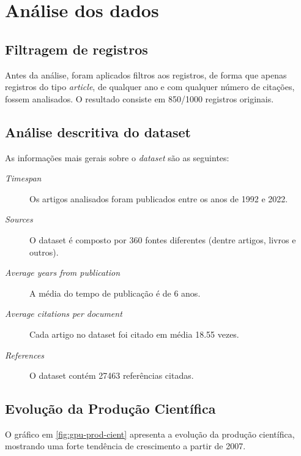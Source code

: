 \section{Análise dos dados}

\subsection{Filtragem de registros}
Antes da análise, foram aplicados filtros aos registros, de forma que apenas registros do tipo \textit{article}, de qualquer ano e com qualquer número de citações, fossem analisados. O resultado consiste em 850/1000 registros originais.

\subsection{Análise descritiva do dataset}

As informações mais gerais sobre o \textit{dataset} são as seguintes:
\begin{description}
    \item  [\textit{Timespan}] Os artigos analisados foram publicados entre os anos de 1992 e 2022.
    \item  [\textit{Sources}] O dataset é composto por 360 fontes diferentes (dentre artigos, livros e outros).
    \item 
    [\textit{Average years from publication}] A média do tempo de publicação é de 6 anos.
    \item 
    [\textit{Average citations per document}] Cada artigo no dataset foi citado em média 18.55 vezes.
    \item 
    [\textit{References}] O dataset contém 27463 referências citadas.
\end{description}

\subsection{Evolução da Produção Científica}

O gráfico em \ref{fig:gpu-prod-cient} apresenta a evolução da produção científica, mostrando uma forte tendência de crescimento a partir de 2007.

